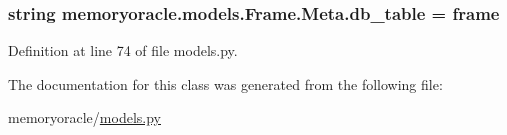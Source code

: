 \subsubsection[{db\+\_\+table}]{\setlength{\rightskip}{0pt plus 5cm}string memoryoracle.\+models.\+Frame.\+Meta.\+db\+\_\+table = \textquotesingle{}frame\textquotesingle{}\hspace{0.3cm}{\ttfamily [static]}}\label{classmemoryoracle_1_1models_1_1Frame_1_1Meta_affeb34a34607a697f608778a2a94d558}


Definition at line 74 of file models.\+py.



The documentation for this class was generated from the following file\+:\begin{DoxyCompactItemize}
\item 
memoryoracle/\hyperlink{models_8py}{models.\+py}\end{DoxyCompactItemize}
